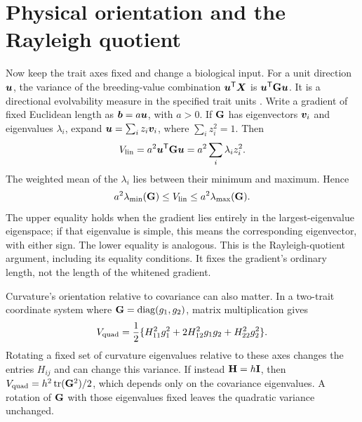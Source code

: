 \section{Physical orientation and the Rayleigh quotient}
\label{geometry:physical_orientation}

Now keep the trait axes fixed and change a biological input. For a unit
direction $\boldsymbol{u}$, the variance of the breeding-value combination
$\boldsymbol{u}^{\mathsf T}\boldsymbol{X}$ is
$\boldsymbol{u}^{\mathsf T}\mathbf{G}\boldsymbol{u}$. It is a directional evolvability
measure in the specified trait units \citep{HansenHoule2008}. Write a
gradient of fixed Euclidean length as $\boldsymbol{b}=a\boldsymbol{u}$, with $a>0$.
If $\mathbf{G}$ has eigenvectors $\boldsymbol{v}_i$ and eigenvalues $\lambda_i$,
expand $\boldsymbol{u}=\sum_i z_i\boldsymbol{v}_i$, where $\sum_i z_i^2=1$.
Then
\begin{equation}
V_{\mathrm{lin}}=a^2\boldsymbol{u}^{\mathsf T}\mathbf{G}\boldsymbol{u}
      =a^2\sum_i\lambda_i z_i^2.
\label{geometry:rayleigh_expansion}
\end{equation}
The weighted mean of the $\lambda_i$ lies between their minimum and
maximum. Hence
\begin{equation}
a^2\lambda_{\min}(\mathbf{G})
 \leq V_{\mathrm{lin}}\leq a^2\lambda_{\max}(\mathbf{G}).
\label{geometry:rayleigh_bound}
\end{equation}
The upper equality holds when the gradient lies entirely in the
largest-eigenvalue eigenspace; if that eigenvalue is simple, this means
the corresponding eigenvector, with either sign. The lower equality is
analogous. This is the Rayleigh-quotient argument, including its equality
conditions. It fixes the gradient's ordinary length, not the length of
the whitened gradient.

Curvature's orientation relative to covariance can also matter. In a
two-trait coordinate system where $\mathbf{G}=\operatorname{diag}(g_1,g_2)$,
matrix multiplication gives
\begin{equation}
V_{\mathrm{quad}}=\frac12\{H_{11}^2g_1^2
                     +2H_{12}^2g_1g_2+H_{22}^2g_2^2\}.
\label{geometry:two_trait_curvature}
\end{equation}
Rotating a fixed set of curvature eigenvalues relative to these axes
changes the entries $H_{ij}$ and can change this variance. If instead
$\mathbf{H}=h\mathbf{I}$, then
$V_{\mathrm{quad}}=h^2\operatorname{tr}(\mathbf{G}^2)/2$, which depends only on the covariance
eigenvalues. A rotation of $\mathbf{G}$ with those eigenvalues fixed leaves
the quadratic variance unchanged.

